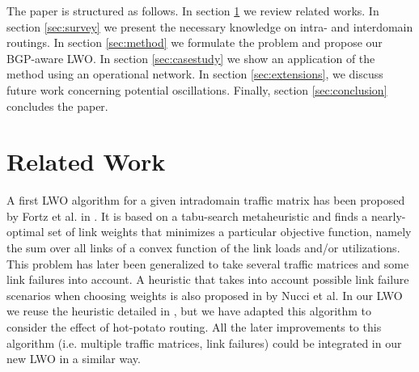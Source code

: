 \documentclass{acm_proc_article-sp}
\begin{document}
The paper is structured as follows. In section \ref{sec:relatedwork} we review related
works. In section \ref{sec:survey} we present the necessary knowledge on intra- 
and interdomain routings. In section \ref{sec:method} we formulate the problem and propose our
BGP-aware LWO. In section \ref{sec:casestudy} we show an application of
the method using an operational network. In section \ref{sec:extensions}, we discuss
future work concerning potential oscillations. Finally, section \ref{sec:conclusion}
concludes the paper.

\section{Related Work}
\label{sec:relatedwork}

A first LWO algorithm for a given intradomain traffic matrix has been 
proposed by Fortz et al. in \cite{fortz1}.
It is based on a tabu-search metaheuristic and finds a
nearly-optimal set of link weights that minimizes a particular objective function, 
namely the sum over all links of a convex function of the link loads and/or utilizations. 
This problem has later been generalized to take several
traffic matrices \cite{fortz2} and some link failures \cite{fortz3} into
account. 
A heuristic that takes into account possible link failure
scenarios when choosing weights is also proposed in \cite{nucci} by Nucci et al. 
In our LWO we reuse the heuristic detailed in \cite{fortz1}, but 
we have adapted this algorithm to consider the effect of hot-potato routing. 
All the later improvements to this algorithm
(i.e. multiple traffic matrices, link failures) could be
integrated in our new LWO in a similar way.
\end{document}
